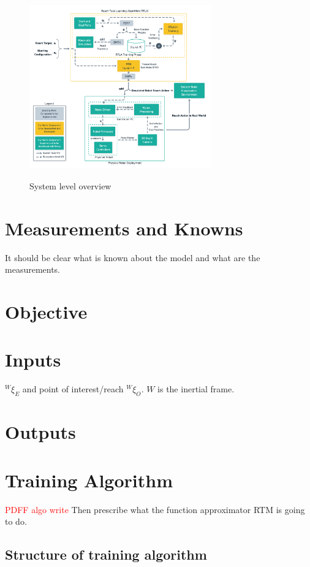 \documentclass[10pt]{article}
\begin{document}
\begin{figure}[h]
\centering
\includegraphics[width=0.7\textwidth]{system_level_overview.png}
\label{fig:system_level_overview}
\caption{System level overview}
\end{figure}

\section{Measurements and Knowns}
It should be clear what is known about the model and what are the measurements.

\section{Objective}

\section{Inputs}
$^{W}\xi_{E}$ and point of interest/reach $^{W}\xi_{O}$. $W$ is the inertial frame.

\section{Outputs}

\section{Training Algorithm}
\textcolor{red}{PDFF algo write}
Then prescribe what the function approximator RTM is going to do.

\subsection{Structure of training algorithm}
\end{document}
